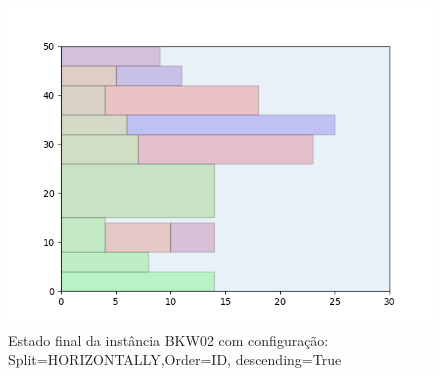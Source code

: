\begin{figure}[H]
    \centering
    \caption[]{Estado final da instância BKW02 com configuração: Split=HORIZONTALLY,Order=ID, descending=True}
    \label{fig:bkw02-horizontally-id-true}
    \includegraphics[scale=0.5]{output/figures/bkw/bkw02/horizontally/id/true/00}
\end{figure}